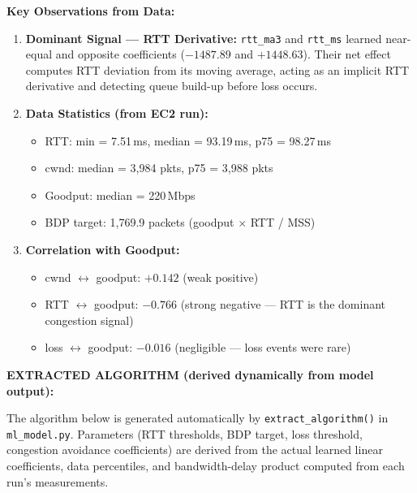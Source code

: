 \documentclass[11pt]{article}
\begin{document}
\textbf{Key Observations from Data:}
\begin{enumerate}
    \item \textbf{Dominant Signal — RTT Derivative:} \texttt{rtt\_ma3} and \texttt{rtt\_ms} learned near-equal and opposite coefficients ($-1487.89$ and $+1448.63$). Their net effect computes RTT deviation from its moving average, acting as an implicit RTT derivative and detecting queue build-up before loss occurs.
    \item \textbf{Data Statistics (from EC2 run):}
    \begin{itemize}
        \item RTT: min = 7.51\,ms, median = 93.19\,ms, p75 = 98.27\,ms
        \item cwnd: median = 3,984 pkts, p75 = 3,988 pkts
        \item Goodput: median = 220\,Mbps
        \item BDP target: 1,769.9 packets (goodput $\times$ RTT / MSS)
    \end{itemize}
    \item \textbf{Correlation with Goodput:}
    \begin{itemize}
        \item cwnd $\leftrightarrow$ goodput: $+0.142$ (weak positive)
        \item RTT $\leftrightarrow$ goodput: $-0.766$ (strong negative — RTT is the dominant congestion signal)
        \item loss $\leftrightarrow$ goodput: $-0.016$ (negligible — loss events were rare)
    \end{itemize}
\end{enumerate}

\textbf{EXTRACTED ALGORITHM (derived dynamically from model output):}

The algorithm below is generated automatically by \texttt{extract\_algorithm()} in \texttt{ml\_model.py}. Parameters (RTT thresholds, BDP target, loss threshold, congestion avoidance coefficients) are derived from the actual learned linear coefficients, data percentiles, and bandwidth-delay product computed from each run's measurements.
\end{document}
